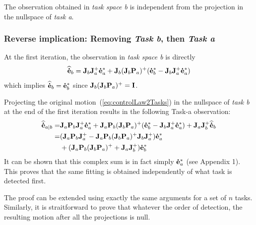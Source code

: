 \documentclass[letterpaper, 10pt, conference]{ieeeconf}      %
\begin{document}
The observation obtained in \emph{task space b} is independent from the
projection in the nullspace of \emph{task a}.

\subsubsection{Reverse implication: Removing \emph{Task b}, then \emph{Task a}}

At the first iteration, the observation in \emph{task space b} is directly
\begin{equation*}
{\mathbf{\widehat{\dot{e}}}}_{b}  = {\mathbf{J}}_{b} {\mathbf{J}}_{a}^+ {\mathbf{\dot{e}}}_{a}^* + {\mathbf{J}}_{b} ( {\mathbf{J}}_{b} {\mathbf{P}}_{a} )^+ ( {\mathbf{\dot{e}}}_{b}^* - {\mathbf{J}}_{b} {\mathbf{J}}_{a}^+ {\mathbf{\dot{e}}}_{a}^* )
\end{equation*}
which implies ${\mathbf{\widehat{\dot{e}}}}_{b} = {\mathbf{\dot{e}}}_{b}^*$ since ${\mathbf{J}}_{b} ( {\mathbf{J}}_{b} {\mathbf{P}}_{a} )^+ = {\mathbf{I}}$.

Projecting the original motion~(\ref{eq:controlLaw2Tasks}) in the nullspace of \emph{task b} at the
end of the first iteration results in the following Task-a observation:
\begin{align*}
{\mathbf{\widehat{\dot{e}}}}_{a|b} =& {\mathbf{J}}_{a} {\mathbf{P}}_{b} {\mathbf{J}}_{a}^+ {\mathbf{\dot{e}}}_{a}^* +
 {\mathbf{J}}_{a} {\mathbf{P}}_{b} ({\mathbf{J}}_{b} {\mathbf{P}}_{a} )^+ ( {\mathbf{\dot{e}}}_{b}^* - {\mathbf{J}}_{b} {\mathbf{J}}_{a}^+ {\mathbf{\dot{e}}}_{a}^*)
+ {\mathbf{J}}_{a} {\mathbf{J}}_{b}^+ {\mathbf{\widehat{\dot{e}}}}_{b} \\
=& ({\mathbf{J}}_{a} {\mathbf{P}}_{b} {\mathbf{J}}_{a}^+ - {\mathbf{J}}_{a} {\mathbf{P}}_{b} ({\mathbf{J}}_{b} {\mathbf{P}}_{a} )^+ {\mathbf{J}}_{b} {\mathbf{J}}_{a}^+) {\mathbf{\dot{e}}}_{a}^* \\
&+ ({\mathbf{J}}_{a} {\mathbf{P}}_{b} ({\mathbf{J}}_{b} {\mathbf{P}}_{a} )^+ + {\mathbf{J}}_{a} {\mathbf{J}}_{b}^+) {\mathbf{\dot{e}}}_{b}^*
\end{align*}
It can be shown that this complex sum is in fact simply ${\mathbf{\dot{e}}}_{a}^*$ (see Appendix 1).
%
This proves that the same fitting is obtained independently of what task is
detected first.  \QED

\medskip
 The proof can be extended using exactly the same arguments for
a set of $n$ tasks.
Similarly, it is straitforward to prove that whatever the order of detection, the resulting motion after all the projections is null.
\end{document}
